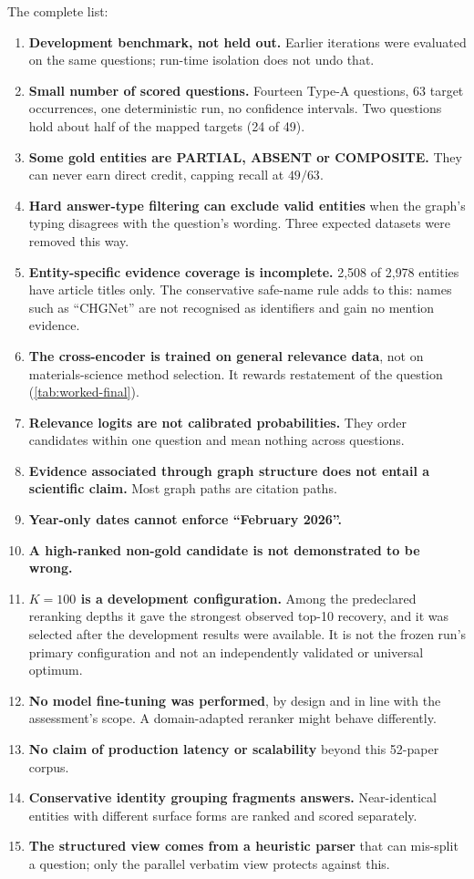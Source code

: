 \documentclass[11pt,a4paper]{article}
\newcommand{\cref}[1]{\autoref{#1}}
\theoremstyle{remark}
\begin{document}
The complete list:

\begin{enumerate}
  \item \textbf{Development benchmark, not held out.} Earlier iterations were evaluated on
        the same questions; run-time isolation does not undo that.
  \item \textbf{Small number of scored questions.} Fourteen Type-A questions, 63 target
        occurrences, one deterministic run, no confidence intervals. Two questions hold
        about half of the mapped targets (24 of 49).
  \item \textbf{Some gold entities are PARTIAL, ABSENT or COMPOSITE.} They can never earn
        direct credit, capping recall at $49/63$.
  \item \textbf{Hard answer-type filtering can exclude valid entities} when the graph's
        typing disagrees with the question's wording. Three expected datasets were removed
        this way.
  \item \textbf{Entity-specific evidence coverage is incomplete.} 2{,}508 of 2{,}978
        entities have article titles only. The conservative safe-name rule adds to this:
        names such as ``CHGNet'' are not recognised as identifiers and gain no mention
        evidence.
  \item \textbf{The cross-encoder is trained on general relevance data}, not on
        materials-science method selection. It rewards restatement of the question
        (\cref{tab:worked-final}).
  \item \textbf{Relevance logits are not calibrated probabilities.} They order candidates
        within one question and mean nothing across questions.
  \item \textbf{Evidence associated through graph structure does not entail a scientific
        claim.} Most graph paths are citation paths.
  \item \textbf{Year-only dates cannot enforce ``February 2026''.}
  \item \textbf{A high-ranked non-gold candidate is not demonstrated to be wrong.}
  \item \textbf{$K=100$ is a development configuration.} Among the predeclared reranking
        depths it gave the strongest observed top-10 recovery, and it was selected after
        the development results were available. It is not the frozen run's primary
        configuration and not an independently validated or universal optimum.
  \item \textbf{No model fine-tuning was performed}, by design and in line with the
        assessment's scope. A domain-adapted reranker might behave differently.
  \item \textbf{No claim of production latency or scalability} beyond this 52-paper
        corpus.
  \item \textbf{Conservative identity grouping fragments answers.} Near-identical entities
        with different surface forms are ranked and scored separately.
  \item \textbf{The structured view comes from a heuristic parser} that can mis-split a
        question; only the parallel verbatim view protects against this.
\end{enumerate}
\end{document}
